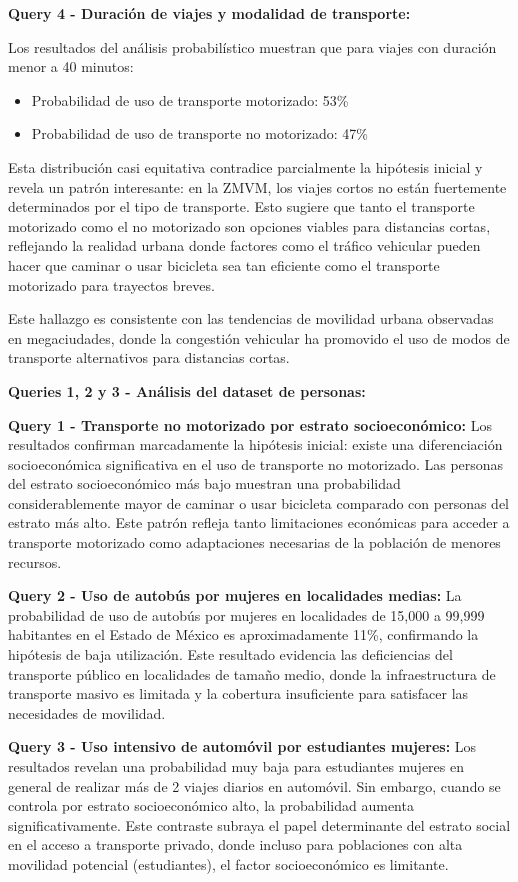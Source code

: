 \documentclass[12pt,a4paper]{article}
\begin{document}
\textbf{Query 4 - Duración de viajes y modalidad de transporte:}

Los resultados del análisis probabilístico muestran que para viajes con duración menor a 40 minutos:
\begin{itemize}
    \item Probabilidad de uso de transporte motorizado: 53\%
    \item Probabilidad de uso de transporte no motorizado: 47\%
\end{itemize}

Esta distribución casi equitativa contradice parcialmente la hipótesis inicial y revela un patrón interesante: en la ZMVM, los viajes cortos no están fuertemente determinados por el tipo de transporte. Esto sugiere que tanto el transporte motorizado como el no motorizado son opciones viables para distancias cortas, reflejando la realidad urbana donde factores como el tráfico vehicular pueden hacer que caminar o usar bicicleta sea tan eficiente como el transporte motorizado para trayectos breves.

Este hallazgo es consistente con las tendencias de movilidad urbana observadas en megaciudades, donde la congestión vehicular ha promovido el uso de modos de transporte alternativos para distancias cortas.

\textbf{Queries 1, 2 y 3 - Análisis del dataset de personas:}

\textbf{Query 1 - Transporte no motorizado por estrato socioeconómico:}
Los resultados confirman marcadamente la hipótesis inicial: existe una diferenciación socioeconómica significativa en el uso de transporte no motorizado. Las personas del estrato socioeconómico más bajo muestran una probabilidad considerablemente mayor de caminar o usar bicicleta comparado con personas del estrato más alto. Este patrón refleja tanto limitaciones económicas para acceder a transporte motorizado como adaptaciones necesarias de la población de menores recursos.

\textbf{Query 2 - Uso de autobús por mujeres en localidades medias:}
La probabilidad de uso de autobús por mujeres en localidades de 15,000 a 99,999 habitantes en el Estado de México es aproximadamente 11\%, confirmando la hipótesis de baja utilización. Este resultado evidencia las deficiencias del transporte público en localidades de tamaño medio, donde la infraestructura de transporte masivo es limitada y la cobertura insuficiente para satisfacer las necesidades de movilidad.

\textbf{Query 3 - Uso intensivo de automóvil por estudiantes mujeres:}
Los resultados revelan una probabilidad muy baja para estudiantes mujeres en general de realizar más de 2 viajes diarios en automóvil. Sin embargo, cuando se controla por estrato socioeconómico alto, la probabilidad aumenta significativamente. Este contraste subraya el papel determinante del estrato social en el acceso a transporte privado, donde incluso para poblaciones con alta movilidad potencial (estudiantes), el factor socioeconómico es limitante.
\end{document}
